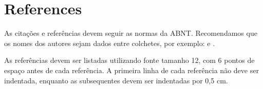 \documentclass[12pt]{article}
\begin{document}
\section{References}

As citações e referências devem seguir as normas da ABNT. Recomendamos que os nomes dos autores sejam dados entre colchetes, por exemplo: \cite{kolevaPropertiesMixedReality1999} e \cite{toriIntroducaoRealidadeVirtual2020}.

As referências devem ser listadas utilizando fonte tamanho 12, com 6 pontos de espaço antes de cada referência. A primeira linha de cada referência não deve ser indentada, enquanto as subsequentes devem ser indentadas por 0,5 cm.



\end{document}
